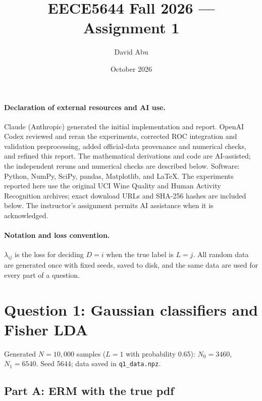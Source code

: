 \documentclass[10pt]{article}
\title{EECE5644 Fall 2026 --- Assignment 1}
\author{David Abu}
\date{October 2026}
\begin{document}
\maketitle

\paragraph{Declaration of external resources and AI use.}
Claude (Anthropic) generated the initial implementation and report. OpenAI Codex reviewed and reran the experiments, corrected ROC integration and validation preprocessing, added official-data provenance and numerical checks, and refined this report. The mathematical derivations and code are AI-assisted; the independent reruns and numerical checks are described below. Software: Python, NumPy, SciPy, pandas, Matplotlib, and LaTeX. The experiments reported here use the original UCI Wine Quality and Human Activity Recognition archives; exact download URLs and SHA-256 hashes are included below. The instructor's assignment permits AI assistance when it is acknowledged.

\paragraph{Notation and loss convention.} $\lambda_{ij}$ is the loss for deciding $D=i$ when the true label is $L=j$. All random data are generated once with fixed seeds, saved to disk, and the same data are used for every part of a question.

\section*{Question 1: Gaussian classifiers and Fisher LDA}

Generated $N=10{,}000$ samples ($L=1$ with probability 0.65): $N_0=3460$, $N_1=6540$. Seed 5644; data saved in \texttt{q1\_data.npz}.

\subsection*{Part A: ERM with the true pdf}
\end{document}
